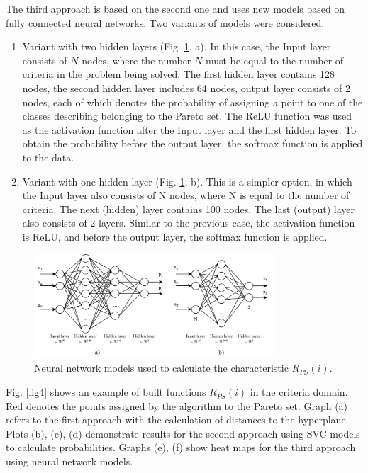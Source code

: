 \documentclass[runningheads]{llncs}
\begin{document}
The third approach is based on the second one and uses new models based on fully connected neural networks. Two variants of models were considered.
\begin{enumerate}
	\item Variant with two hidden layers (Fig. \ref{fig3}, a). In this case, the Input layer consists of $N$ nodes, where the number $N$ must be equal to the number of criteria in the problem being solved. The first hidden layer contains 128 nodes, the second hidden layer includes 64 nodes, output layer consists of 2 nodes, each of which denotes the probability of assigning a point to one of the classes describing belonging to the Pareto set. The ReLU function was used as the activation function after the Input layer and the first hidden layer. To obtain the probability before the output layer, the softmax function is applied to the data.
	\item Variant with one hidden layer (Fig. \ref{fig3}, b).  This is a simpler option, in which the Input layer also consists of N nodes, where N is equal to the number of criteria. The next (hidden) layer contains 100 nodes. The last (output) layer also consists of 2 layers. Similar to the previous case, the activation function is ReLU, and before the output layer, the softmax function is applied.
\end{enumerate}

\begin{figure}[t]
\center
\includegraphics[width=0.8\textwidth]{fig3.png}
\caption{Neural network models used to calculate the characteristic $R_{PS}(i)$.} \label{fig3}
\end{figure}

Fig. \ref{fig4} shows an example of built functions $R_{PS}(i)$ in the criteria domain. Red denotes the points assigned by the algorithm to the Pareto set. Graph (a) refers to the first approach with the calculation of distances to the hyperplane. Plots (b), (c), (d) demonstrate results for the second approach using SVC models to calculate probabilities. Graphs (e), (f) show heat maps for the third approach using neural network models.
\end{document}
